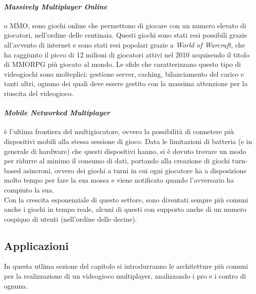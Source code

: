         \paragraph{\textit{Massively Multiplayer Online}} o MMO, sono giochi online che permettono di giocare con un numero elevato di giocatori, nell'ordine delle centinaia. Questi
            giochi sono stati resi possibili grazie all'avvento di internet e sono stati resi popolari grazie a \textit{World of Warcraft}, che ha raggiunto il picco di 12 milioni di
            giocatori attivi nel 2010 acquisendo il titolo di MMORPG più giocato al mondo. Le sfide che caratterizzano questo tipo di videogiochi sono molteplici: gestione server, 
            caching, bilanciamento del carico e tanti altri, ognuno dei quali deve essere gestito con la massima attenzione per la riuscita del videogioco.

        \paragraph{\textit{Mobile Networked Multiplayer}} è l'ultima frontiera del multigiocatore, ovvero la possibilità di connetere più dispositivi mobili alla stessa sessione di 
            gioco. Data le limitazioni di batteria (e in generale di hardware) che questi dispositivi hanno, si è dovuto trovare un modo per ridurre al minimo il consumo di dati,
            portando alla creazione di giochi turn-based asincroni, ovvero dei giochi a turni in cui ogni giocatore ha a disposizione molto tempo per fare la sua mossa e viene
            notificato quando l'avversario ha compiuto la sua.\\
            Con la crescita esponenziale di questo settore, sono diventati sempre più comuni anche i giochi in tempo reale, alcuni di questi con supporto anche di un numero cospiquo
            di utenti (nell'ordine delle decine).
        
    \subsection{Applicazioni}\label{subsec:MultiApplicazioni}
        In questa utlima sezione del capitolo si introdurranno le architetture più comuni per la realizzazione di un videogioco multiplayer, analizzando i pro e i contro di ognuna.
